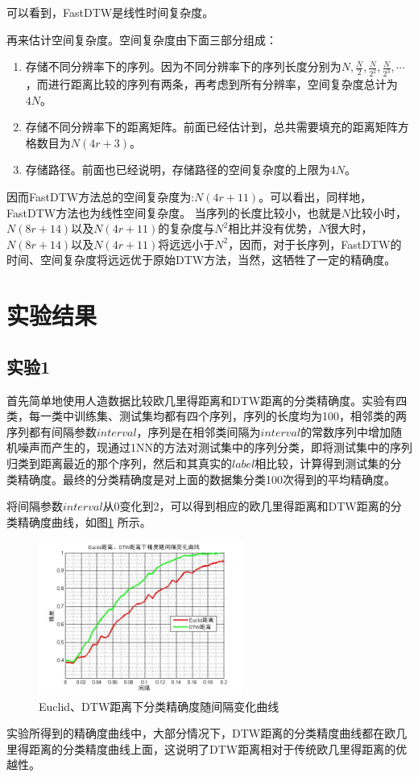 可以看到，FastDTW是线性时间复杂度。

再来估计空间复杂度。空间复杂度由下面三部分组成：
\begin{enumerate}
  \item 存储不同分辨率下的序列。因为不同分辨率下的序列长度分别为$N,\frac{N}{2},\frac{N}{2^2},\frac{N}{2^3},\cdots$，而进行距离比较的序列有两条，再考虑到所有分辨率，空间复杂度总计为$4N$。
  \item 存储不同分辨率下的距离矩阵。前面已经估计到，总共需要填充的距离矩阵方格数目为$N(4r+3)$。
  \item 存储路径。前面也已经说明，存储路径的空间复杂度的上限为$4N$。
\end{enumerate}
因而FastDTW方法总的空间复杂度为:$N(4r+11)$。可以看出，同样地，FastDTW方法也为线性空间复杂度。
当序列的长度比较小，也就是$N$比较小时，$N(8r+14)$以及$N(4r+11)$的复杂度与$N^2$相比并没有优势，$N$很大时，$N(8r+14)$以及$N(4r+11)$将远远小于$N^2$，因而，对于长序列，FastDTW的时间、空间复杂度将远远优于原始DTW方法，当然，这牺牲了一定的精确度。

\section{实验结果}
\subsection{实验1}
首先简单地使用人造数据比较欧几里得距离和DTW距离的分类精确度。实验有四类，每一类中训练集、测试集均都有四个序列，序列的长度均为100，相邻类的两序列都有间隔参数$interval$，序列是在相邻类间隔为$interval$的常数序列中增加随机噪声而产生的，现通过1NN的方法对测试集中的序列分类，即将测试集中的序列归类到距离最近的那个序列，然后和其真实的$label$相比较，计算得到测试集的分类精确度。最终的分类精确度是对上面的数据集分类100次得到的平均精确度。

将间隔参数$interval$从0变化到2，可以得到相应的欧几里得距离和DTW距离的分类精确度曲线，如图\ref{fig:12} 所示。
\begin{figure}[h]
  \centering
  \includegraphics[width=0.6\textwidth]{./figure/interval.jpg}
  \caption{Euclid、DTW距离下分类精确度随间隔变化曲线}\label{fig:12}
\end{figure}
实验所得到的精确度曲线中，大部分情况下，DTW距离的分类精度曲线都在欧几里得距离的分类精度曲线上面，这说明了DTW距离相对于传统欧几里得距离的优越性。

